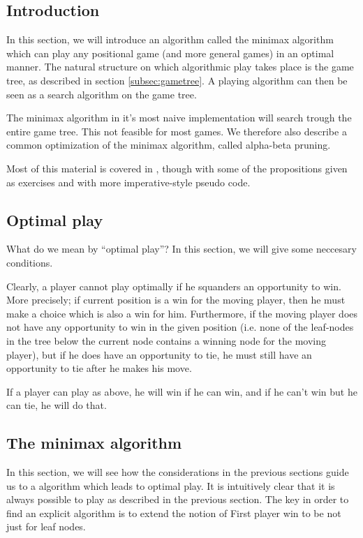 \subsection{Introduction}

In this section, we will introduce an algorithm called the minimax algorithm which can play any positional game (and more general games) in an optimal manner.
The natural structure on which algorithmic play takes place is the game tree, as described in section \ref{subsec:gametree}.
A playing algorithm can then be seen as a search algorithm on the game tree.

The minimax algorithm in it's most naive implementation will search trough the entire game tree. This not feasible for most games.
We therefore also describe a common optimization of the minimax algorithm, called alpha-beta pruning.


Most of this material is covered in \citep{aimodernapproach}, though with some of the propositions given as exercises and with more imperative-style pseudo code.

\subsection{Optimal play}
\label{sec:optimal_play}

What do we mean by ``optimal play''?
In this section, we will give some neccesary conditions.

Clearly, a player cannot play optimally if he squanders an opportunity to win.
More precisely; if current position is a win for the moving player, then he must make a choice which is also a win for him.
Furthermore, if the moving player does not have any opportunity to win in the given position (i.e. none of the leaf-nodes in the tree below the current node contains a winning node for the moving player), but if he does have an opportunity to tie, he must still have an opportunity to tie after he makes his move.

If a player can play as above, he will win if he can win, and if he can't win but he can tie, he will do that.

\subsection{The minimax algorithm}
\label{sec:minimax}

In this section, we will see how the considerations in the previous sections guide us to a algorithm which leads to optimal play.
It is intuitively clear that it is always possible to play as described in the previous section.
The key in order to find an explicit algorithm is to extend the notion of First player win to be not just for leaf nodes.

